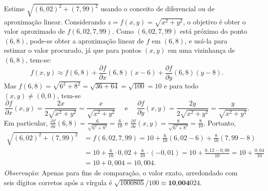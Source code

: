\documentclass[12pt,a4paper]{article}
\begin{document}
\begin{ExerciseList}
\Exercise[title={2,0}] Estime $\sqrt{(6,02)^2 + (7,99)^2}$ usando o conceito de diferencial ou de aproximação linear.
\Answer Considerando $z = f(x, y) = \sqrt{x^2 + y^2}$, o objetivo é obter o valor aproximado de $f(6,02, 7,99)$. Como $(6,02, 7,99)$ está próximo do ponto $(6, 8)$, pode-se obter a aproximação linear de $f$ em $(6, 8)$, e usá-la para estimar o valor procurado, já que para pontos $(x, y)$ em uma vizinhança de $(6, 8)$, tem-se:
\[
  f(x, y) \approx f(6, 8) + \frac{\partial f}{\partial x}(6, 8)(x - 6) + \frac{\partial f}{\partial y}(6, 8)(y - 8).
\]
Mas $f(6, 8) = \sqrt{6^2 + 8^2} = \sqrt{36 + 64} = \sqrt{100} = 10$ e para todo $(x, y) \neq (0, 0)$, tem-se
\[
  \frac{\partial f}{\partial x}(x, y)
  = \frac{2x}{2\sqrt{x^2 + y^2}}
  = \frac{x}{\sqrt{x^2 + y^2}}
  \quad\text{ e }\quad
  \frac{\partial f}{\partial y}(x, y)
  = \frac{2y}{2\sqrt{x^2 + y^2}}
  = \frac{y}{\sqrt{x^2 + y^2}}.
\]
Em particular, $\frac{\partial f}{\partial x}(6, 8) = \frac{6}{\sqrt{6^2 + 8^2}} = \frac{6}{10}$ e $\frac{\partial f}{\partial x}(x, y) = \frac{8}{\sqrt{6^2 + 8^2}} = \frac{8}{10}$. Portanto,
\begin{align*}
  \sqrt{(6,02)^2 + (7,99)^2}
  & = f(6,02, 7,99)
    = 10 + \frac{6}{10}(6,02 - 6) + \frac{8}{10}(7,99 - 8) \\
  & = 10 + \frac{6}{10} \cdot 0,02 + \frac{8}{10}\cdot (-0,01)
    = 10 + \frac{0,12 - 0,08}{10}
    = 10 + \frac{0,04}{10} \\
  & = 10 + 0,004
    = 10,004.
\end{align*}
\textit{Observação}: Apenas para fins de comparação, o valor exato, arredondado com seis dígitos corretos após a vírgula é $\sqrt{1000805}/100 \approx \textbf{10,004}024$.



\end{ExerciseList}
\end{document}
